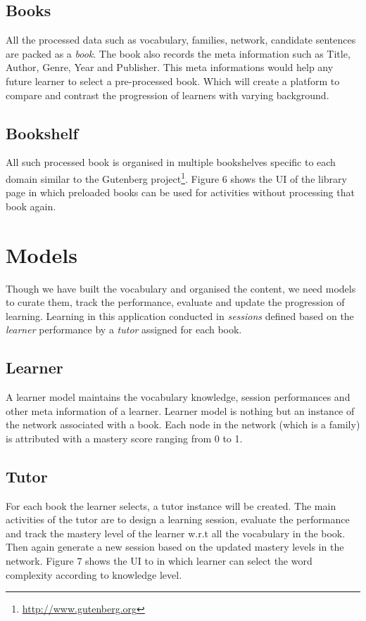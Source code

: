 \documentclass[11pt,a4paper]{article}
\begin{document}
\subsection{Books}

All the processed data such as vocabulary, families, network, candidate sentences
are packed as a \textit{book}. The book also records the meta information such as
Title, Author, Genre, Year and Publisher. This meta informations would help any future learner to select a pre-processed book. Which will create a platform to compare and contrast the progression of learners with varying background.

\subsection{Bookshelf}
All such processed book is organised in multiple bookshelves specific to each
domain similar to the Gutenberg project\footnote{\url{http://www.gutenberg.org}}. Figure 6 shows the UI of the library page in which preloaded books can be used for activities without processing that book again.

\section{Models}
Though we have built the vocabulary and organised the content, we need models to curate them, track the performance, evaluate and update the progression of learning. Learning in this application conducted in \textit{sessions} defined based on the \textit{learner} performance by a \textit{tutor} assigned for each book.

\subsection{Learner}
A learner model maintains the vocabulary knowledge, session performances and other meta information of a learner. Learner model is nothing but an instance of the network associated with a book. Each node in the network (which is a family) is attributed with a mastery score ranging from 0 to 1.

\subsection{Tutor}
For each book the learner selects, a tutor instance will be created. The main
activities of the tutor are to design a learning session, evaluate the
performance and track the mastery level of the learner w.r.t all the vocabulary
in the book. Then again generate a new session based on the updated mastery
levels in the network. Figure 7 shows the UI to in which learner can select the word complexity according to knowledge level.
\end{document}
